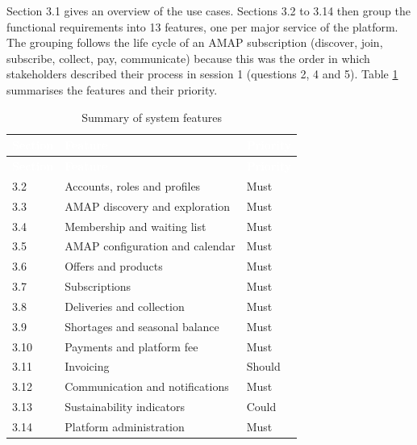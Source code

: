 \documentclass[11pt,a4paper]{article}
\begin{document}
Section 3.1 gives an overview of the use cases. Sections 3.2 to 3.14 then group the functional requirements into 13 features, one per major service of the platform. The grouping follows the life cycle of an AMAP subscription (discover, join, subscribe, collect, pay, communicate) because this was the order in which stakeholders described their process in session 1 (questions 2, 4 and 5). Table \ref{tab:features} summarises the features and their priority.

{\footnotesize
\begin{longtable}{>{\raggedright\arraybackslash\hspace{0pt}}p{}>{\raggedright\arraybackslash\hspace{0pt}}p{}>{\raggedright\arraybackslash\hspace{0pt}}p{}}
\caption{Summary of system features}\label{tab:features}\\
\rowcolor{hdr}\textcolor{white}{\textbf{Section}} & \textcolor{white}{\textbf{Feature}} & \textcolor{white}{\textbf{Priority}} \\ \endfirsthead
\rowcolor{hdr}\textcolor{white}{\textbf{Section}} & \textcolor{white}{\textbf{Feature}} & \textcolor{white}{\textbf{Priority}} \\ \endhead
3.2 & Accounts, roles and profiles & Must \\ \hline
3.3 & AMAP discovery and exploration & Must \\ \hline
3.4 & Membership and waiting list & Must \\ \hline
3.5 & AMAP configuration and calendar & Must \\ \hline
3.6 & Offers and products & Must \\ \hline
3.7 & Subscriptions & Must \\ \hline
3.8 & Deliveries and collection & Must \\ \hline
3.9 & Shortages and seasonal balance & Must \\ \hline
3.10 & Payments and platform fee & Must \\ \hline
3.11 & Invoicing & Should \\ \hline
3.12 & Communication and notifications & Must \\ \hline
3.13 & Sustainability indicators & Could \\ \hline
3.14 & Platform administration & Must \\ \hline
\end{longtable}}
\end{document}
